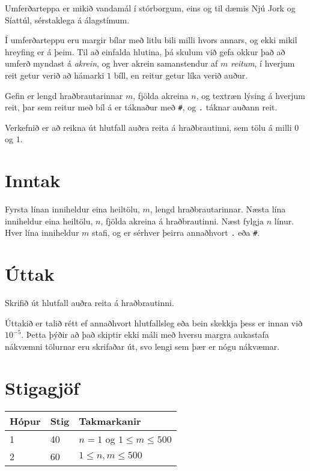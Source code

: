 
Umferðarteppa er mikið vandamál í stórborgum, eins og til dæmis Njú Jork og Síattúl, sérstaklega á álagstímum.

Í umferðarteppu eru margir bílar með litlu bili milli hvors annars, og ekki mikil hreyfing er á þeim.
Til að einfalda hlutina, þá skulum við gefa okkur það að umferð myndast á \emph{akrein}, og hver akrein samanstendur
af $m$ \emph{reitum}, í hverjum reit getur verið að hámarki $1$ bíll, en reitur getur líka verið auður.

Gefin er lengd hraðbrautarinnar $m$, fjölda akreina $n$, og textræn lýsing á hverjum reit, þar sem reitur með bíl
á er táknaður með \texttt{\#}, og \texttt{.} táknar auðann reit.

Verkefnið er að reikna út hlutfall auðra reita á hraðbrautinni, sem tölu á milli $0$ og $1$.

\section*{Inntak}
Fyrsta línan inniheldur eina heiltölu, $m$, lengd hraðbrautarinnar.
Næsta lína inniheldur eina heiltölu, $n$, fjölda akreina á hraðbrautinni.
Næst fylgja $n$ línur.
Hver lína inniheldur $m$ stafi, og er sérhver þeirra annaðhvort \texttt{.} eða \texttt{\#}.

\section*{Úttak}
Skrifið út hlutfall auðra reita á hraðbrautinni.

Úttakið er talið rétt ef annaðhvort hlutfallsleg eða bein skekkja þess er innan við 
$10^{-5}$. Þetta þýðir að það skiptir ekki máli með hversu margra aukastafa nákvæmni tölurnar eru skrifaðar út, svo lengi sem þær er nógu nákvæmar.

\section*{Stigagjöf}
\begin{tabular}{|l|l|l|}
\hline
Hópur & Stig & Takmarkanir \\ \hline
1     & 40   & $n = 1$ og $1 \leq m \leq 500$ \\ \hline
2     & 60   & $1 \leq n, m \leq 500$ \\ \hline
\end{tabular}

